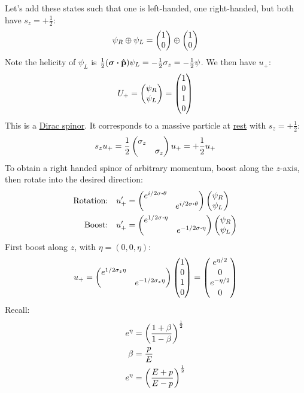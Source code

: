 Let's add these states such that one is left-handed, one right-handed, but both have $s_z=+\frac12$:
\begin{align*}
  \psi_R\oplus\psi_L=\pmqty{1\\0}\oplus\pmqty{1\\0}
\end{align*}
Note the helicity of $\psi_L$ is $\frac12(\bm{\sigma}\vdot\vu{p})\psi_L=-\frac12\sigma_z=-\frac12\psi$. We then have $u_+$:
\begin{align*}
  U_+=\pmqty{\psi_R\\\psi_L}=\pmqty{1\\0\\1\\0}
\end{align*}
This is a \underline{Dirac spinor}. It corresponds to a massive particle at \underline{rest} with $s_z=+\frac12$:
\begin{align*}
  s_z u_+=\frac12\pmqty{\sigma_z\\&\sigma_z}u_+=+\frac12 u_+
\end{align*}
To obtain a right handed spinor of arbitrary momentum, boost along the $z$-axis, then rotate into the desired direction:
\begin{align*}
  \text{Rotation:}&\quad u_+'=
  \pmqty{e^{i/2\sigma\vdot\theta}\\&e^{i/2\sigma\vdot\theta}}
  \pmqty{\psi_R\\\psi_L}\\
  \text{Boost:}&\quad u_+'=
  \pmqty{e^{1/2\sigma\vdot\eta}\\&e^{-1/2\sigma\vdot\eta}}
  \pmqty{\psi_R\\\psi_L}
\end{align*}
First boost along $z$, with $\eta=(0,0,\eta)$:
\begin{align*}
  u_+=\pmqty{e^{1/2\sigma_z\eta}\\&e^{-1/2\sigma_z\eta}}\pmqty{1\\0\\1\\0}
  =\pmqty{e^{\eta/2}\\0\\e^{-\eta/2}\\0}
\end{align*}
Recall:
\begin{align*}
  e^\eta&={\qty(\frac{1+\beta}{1-\beta})}^{\frac12}\\
  \beta&=\frac{p}{E}\\
  e^\eta&={\qty(\frac{E+p}{E-p})}^{\frac12}
\end{align*}
